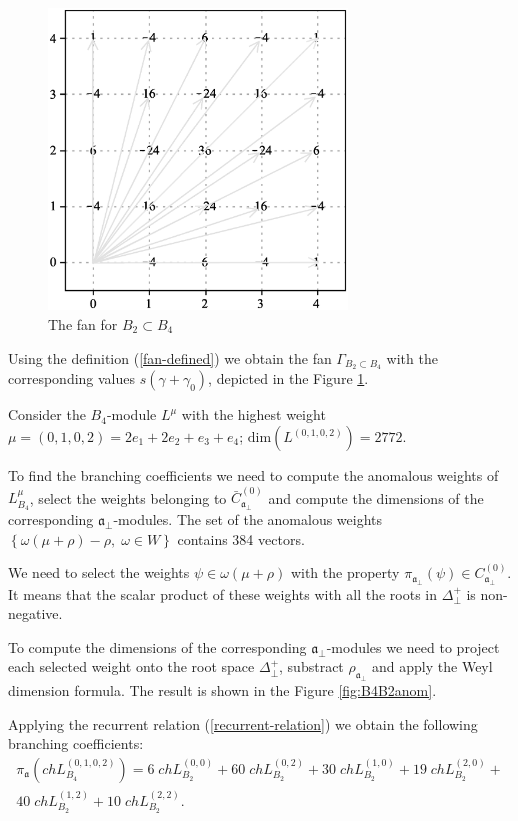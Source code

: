 \documentclass[12pt]{iopart}
\begin{document}
\begin{figure}[b]
  \centering
  \includegraphics[height=80mm]{figure5.eps}
  \caption{The fan for $B_2\subset B_4$}
  \label{fig:B4B2Fan}
\end{figure}

Using the definition (\ref{fan-defined}) we obtain the fan $\Gamma_{B_2\subset B_4}$ with the corresponding values $s(\gamma+\gamma_0)$, depicted in the Figure \ref{fig:B4B2Fan}.


Consider the $B_4$-module $L^{\mu}$ with the highest weight $\mu=(0,1,0,2)=2
e_1 + 2 e_2 + e_3 + e_4$; $\mathrm{dim}(L^{(0,1,0,2)})=2772$.

To find the branching coefficients we need to compute the anomalous weights of $L^{\mu}_{B_4}$, select the weights belonging to $\bar{C}^{\left( 0 \right)}_{\mathfrak{a}_{\bot}}$ and compute the dimensions of the corresponding $\mathfrak{a}_{\bot}$-modules.
The set of the anomalous weights $\left\{ \omega(\mu+\rho)-\rho,\; \omega\in W\right\}$
contains 384 vectors.

We need to select the weights $\psi \in \omega(\mu+\rho)$  with the property $\pi_{\mathfrak{a}_{\bot}} \left(  \psi \right) \in C^{\left( 0 \right)}_{\mathfrak{a}_{\bot}}$.
It means that the scalar product of these weights with all the roots in $\Delta^{+}_{\bot}$ is non-negative.

To compute the dimensions of the corresponding
$\mathfrak{a}_{\bot}$-modules we need to project each selected weight
onto the root space $\Delta^{+}_{\bot}$, substract
$\rho_{\mathfrak{a}_{\bot}}$ and apply the Weyl dimension formula. The result is shown in the Figure \ref{fig:B4B2anom}.

Applying the recurrent relation (\ref{recurrent-relation}) we obtain the
following branching coefficients:
\begin{eqnarray*}
  \label{eq:24}
  \pi_{\mathfrak{a}} \left(ch L^{(0,1,0,2)}_{B_4}\right) = 6 \; ch L^{(0,0)}_{B_2}+ 60
  \; ch L_{B_2}^{(0,2)}+ 30 \; ch L_{B_2}^{(1,0)}+ 19 \; ch L_{B_2}^{(2,0)}+\\
  40 \; ch L_{B_2}^{(1,2)}+ 10 \; ch L_{B_2}^{(2,2)}.
\end{eqnarray*}
\end{document}
